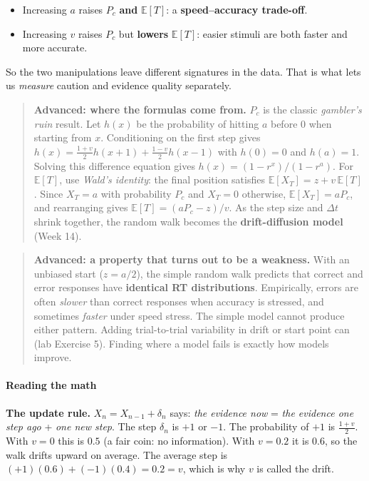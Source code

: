 \begin{itemize}
\tightlist
\item
  Increasing \(a\) raises \(P_c\) \textbf{and} \(\mathbb{E}[T]\): a
  \textbf{speed--accuracy trade-off}.
\item
  Increasing \(v\) raises \(P_c\) but \textbf{lowers} \(\mathbb{E}[T]\):
  easier stimuli are both faster and more accurate.
\end{itemize}

So the two manipulations leave different signatures in the data. That is
what lets us \emph{measure} caution and evidence quality separately.

\begin{quote}
\textbf{Advanced: where the formulas come from.} \(P_c\) is the classic
\emph{gambler's ruin} result. Let \(h(x)\) be the probability of hitting
\(a\) before \(0\) when starting from \(x\). Conditioning on the first
step gives \(h(x) = \tfrac{1+v}{2}h(x+1) + \tfrac{1-v}{2}h(x-1)\) with
\(h(0)=0\) and \(h(a)=1\). Solving this difference equation gives
\(h(x) = (1-r^x)/(1-r^a)\). For \(\mathbb{E}[T]\), use \emph{Wald's
identity}: the final position satisfies
\(\mathbb{E}[X_T] = z + v\,\mathbb{E}[T]\). Since \(X_T = a\) with
probability \(P_c\) and \(X_T = 0\) otherwise,
\(\mathbb{E}[X_T] = aP_c\), and rearranging gives
\(\mathbb{E}[T] = (aP_c - z)/v\). As the step size and \(\Delta t\)
shrink together, the random walk becomes the \textbf{drift-diffusion
model} (Week 14).
\end{quote}

\begin{quote}
\textbf{Advanced: a property that turns out to be a weakness.} With an
unbiased start (\(z = a/2\)), the simple random walk predicts that
correct and error responses have \textbf{identical RT distributions}.
Empirically, errors are often \emph{slower} than correct responses when
accuracy is stressed, and sometimes \emph{faster} under speed stress.
The simple model cannot produce either pattern. Adding trial-to-trial
variability in drift or start point can (lab Exercise 5). Finding where
a model fails is exactly how models improve.
\end{quote}

\paragraph{Reading the math}

\textbf{The update rule.} \(X_n = X_{n-1} + \delta_n\) says: \emph{the
evidence now} = \emph{the evidence one step ago} + \emph{one new step}.
The step \(\delta_n\) is \(+1\) or \(-1\). The probability of \(+1\) is
\(\tfrac{1+v}{2}\). With \(v = 0\) this is \(0.5\) (a fair coin: no
information). With \(v = 0.2\) it is \(0.6\), so the walk drifts upward
on average. The average step is \((+1)(0.6) + (-1)(0.4) = 0.2 = v\),
which is why \(v\) is called the drift.

